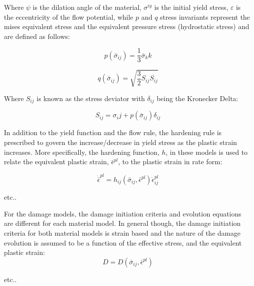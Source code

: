 Where $\psi$ is the dilation angle of the material, $\sigma^{iy}$ is the initial yield stress, $\varepsilon$ is the eccentricity of the flow potential, while $p$ and $q$ stress invariants represent the mises equivalent stress and the equivalent pressure stress (hydrostatic stress) and are defined as follows:

\begin{equation}
p\left(\bar{\sigma}_{ij}\right)=\frac{1}{3}\bar{\sigma}_kk
\label{eqn:druc3}
\end{equation}

\begin{equation}
q\left(\bar{\sigma}_{ij}\right)=\sqrt{\frac{3}{2}S_{ij}S_{ij}}\label{eqn:druc4}
\end{equation}

Where $S_{ij}$ is known as the stress deviator with $\delta_{ij}$ being the Kronecker Delta:

\begin{equation}
S_{ij} = \sigma_ij + p\left(\bar{\sigma}_{ij}\right)\delta_{ij}
\end{equation}

In addition to the yield function and the flow rule, the hardening rule is prescribed to govern the increase/decrease in yield stress as the plastic strain increases. More specifically, the hardening function, $h$, in these models is used to relate the equivalent plastic strain, $\bar{\epsilon}^{pl}$,  to the plastic strain in rate form: 

\begin{equation}
    \dot{\bar{\epsilon}}^{pl} 
    = 
    h_{ij}
    \left(
        \bar{\sigma}_{ij}, \bar{\epsilon}^{pl}
    \right)
    \dot{\epsilon}^{pl}_{ij}
\label{eqn:const8d}
\end{equation}

etc..

For the damage models, the damage initiation criteria and evolution equations are different for each material model. In general though, the damage initiation criteria for both material models is strain based and the nature of the damage evolution is assumed to be a function of the effective stress, and the equivalent plastic strain:
\begin{equation}
D=D\left(\bar{\sigma}_{ij},\bar{\epsilon}^{pl}\right)\label{eqn:const8}
\end{equation}



etc..
